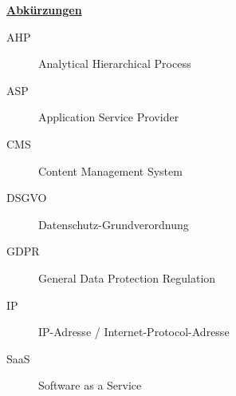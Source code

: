 \vspace{2cm}
\textbf{\underline{Abkürzungen}}
\begin{description}
    \item[AHP] Analytical Hierarchical Process
    \item[ASP] Application Service Provider
    \item[CMS] Content Management System
    \item[DSGVO] Datenschutz-Grundverordnung 
    \item[GDPR] General Data Protection Regulation
    \item[IP] IP-Adresse / Internet-Protocol-Adresse
    \item[SaaS] Software as a Service
  \end{description}
